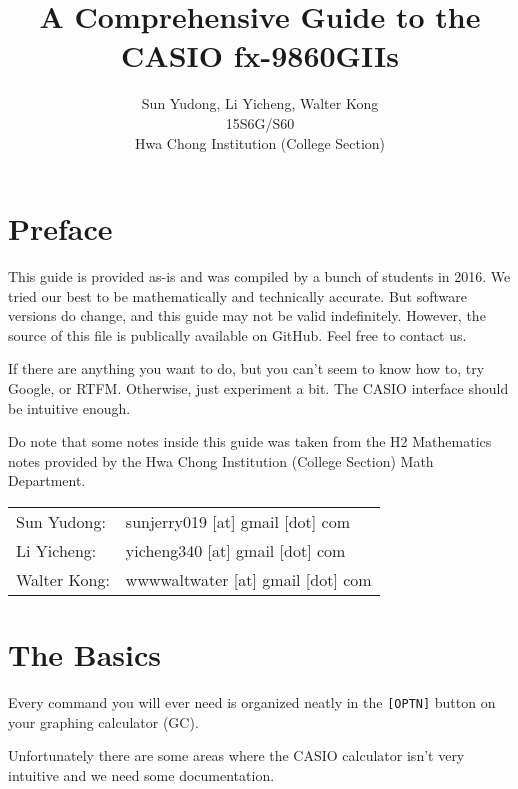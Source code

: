 \documentclass[a5paper]{memoir}
\title{A Comprehensive Guide to the CASIO fx-9860GIIs}
\author{Sun Yudong, Li Yicheng, Walter Kong \\ 15S6G/S60 \\ Hwa Chong Institution (College Section)}
\def\code#1{\texttt{#1}}
\begin{document}
\begin{titlingpage}
	\maketitle
\end{titlingpage}

\frontmatter

\tableofcontents

\chapter{Preface}
This guide is provided as-is and was compiled by a bunch of students in 2016. We tried our best to be mathematically and technically accurate. But software versions do change, and this guide may not be valid indefinitely. However, the source of this file is publically available on GitHub. Feel free to contact us.

If there are anything you want to do, but you can't seem to know how to, try Google, or RTFM. Otherwise, just experiment a bit. The CASIO interface should be intuitive enough.

Do note that some notes inside this guide was taken from the H2 Mathematics notes provided by the Hwa Chong Institution (College Section) Math Department. 

\vspace{1cm}

\begin{tabular}{l l}
	Sun Yudong: & sunjerry019 [at] gmail [dot] com \\
	Li Yicheng: & yicheng340 [at] gmail [dot] com \\
	Walter Kong: & wwwwaltwater [at] gmail [dot] com
\end{tabular}


\mainmatter
\chapter{The Basics}
Every command you will ever need is organized neatly in the \code{[OPTN]} button on your graphing calculator (GC).

Unfortunately there are some areas where the CASIO calculator isn't very intuitive and we need some documentation.
\end{document}
